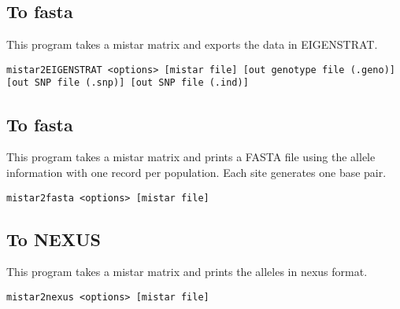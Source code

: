\documentclass[a4paper]{article}
\begin{document}
\subsection{To fasta}
\noindent This program takes a mistar matrix and exports the data in EIGENSTRAT.
\tiny
\begin{lstlisting}
mistar2EIGENSTRAT <options> [mistar file] [out genotype file (.geno)] [out SNP file (.snp)] [out SNP file (.ind)]
\end{lstlisting}
\normalsize
\subsection{To fasta}

\noindent This program takes a mistar matrix and prints a FASTA file using the allele information with one record per population. Each site generates one base pair.

\begin{lstlisting}
mistar2fasta <options> [mistar file] 
\end{lstlisting}

\subsection{To NEXUS}

\noindent This program takes a mistar matrix and prints the alleles in nexus format.

\begin{lstlisting}
mistar2nexus <options> [mistar file]
\end{lstlisting}






\newpage





%

\end{document}
